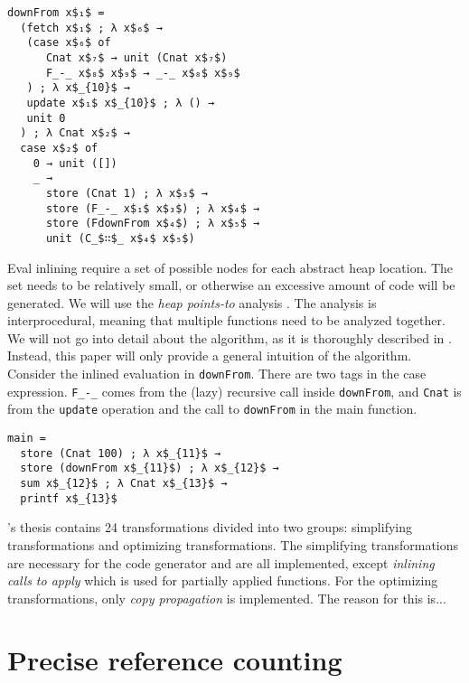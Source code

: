 \documentclass[10pt, twocolumn]{article}
\begin{document}
\begin{lstlisting}
downFrom x$₁$ =
  (fetch x$₁$ ; λ x$₆$ →
   (case x$₆$ of
      Cnat x$₇$ → unit (Cnat x$₇$)
      F_-_ x$₈$ x$₉$ → _-_ x$₈$ x$₉$
   ) ; λ x$_{10}$ →
   update x$₁$ x$_{10}$ ; λ () →
   unit 0
  ) ; λ Cnat x$₂$ →
  case x$₂$ of
    0 → unit ([])
    _ →
      store (Cnat 1) ; λ x$₃$ →
      store (F_-_ x$₁$ x$₃$) ; λ x$₄$ →
      store (FdownFrom x$₄$) ; λ x$₅$ →
      unit (C_$∷$_ x$₄$ x$₅$)
\end{lstlisting}

Eval inlining require a set of possible nodes for each abstract heap location.
The set needs to be relatively small, or otherwise an excessive amount of code will be generated.
We will use the \emph{heap points-to} analysis \citep{johnsson1991}.
The analysis is interprocedural, meaning that multiple functions need to be analyzed together.
We will not go into detail about the algorithm, as it is thoroughly described in \citep{boquist1996}. 
Instead, this paper will only provide a general intuition of the algorithm.
Consider the inlined evaluation in \lstinline{downFrom}.
There are two tags in the case expression. 
\lstinline{F_-_} comes from the (lazy) recursive call inside \lstinline{downFrom}, and 
\lstinline{Cnat} is from the \lstinline{update} operation and the call to \lstinline{downFrom} in the main function.


\begin{lstlisting}
main =
  store (Cnat 100) ; λ x$_{11}$ →
  store (downFrom x$_{11}$) ; λ x$_{12}$ →
  sum x$_{12}$ ; λ Cnat x$_{13}$ →
  printf x$_{13}$
\end{lstlisting}

\citeauthor{boquist1999}'s thesis contains 24 transformations divided into two groups: simplifying transformations and optimizing 
transformations. 
The simplifying transformations are necessary for the code generator and are all implemented, except \emph{inlining calls to apply}
which is used for partially applied functions. 
For the optimizing transformations, only \emph{copy propagation} is implemented.
The reason for this is...


\section{Precise reference counting}
\end{document}
